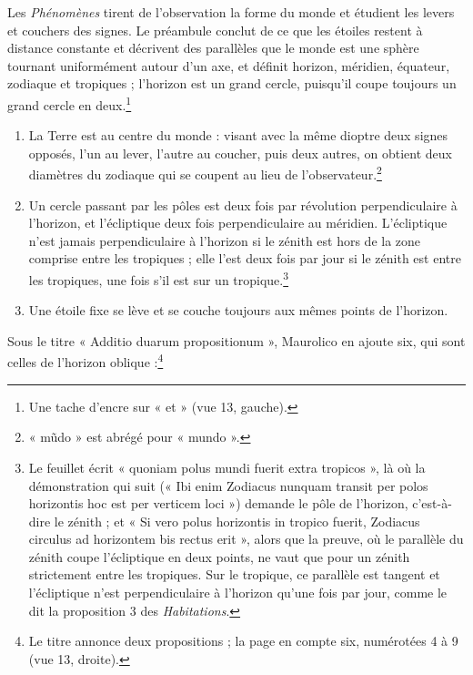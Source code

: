 \documentclass[11pt,a4paper]{article}
\begin{document}
Les \emph{Phénomènes} tirent de l'observation la forme du monde et étudient les
levers et couchers des signes. Le préambule conclut de ce que les étoiles restent
à distance constante et décrivent des parallèles que le monde est une sphère
tournant uniformément autour d'un axe, et définit horizon, méridien, équateur,
zodiaque et tropiques ; l'horizon est un grand cercle, puisqu'il coupe toujours
un grand cercle en deux.\footnote{Une tache d'encre sur « et » (vue 13, gauche).}

\begin{enumerate}
  \item[1.] La Terre est au centre du monde : visant avec la même dioptre deux
    signes opposés, l'un au lever, l'autre au coucher, puis deux autres, on
    obtient deux diamètres du zodiaque qui se coupent au lieu de
    l'observateur.\footnote{« mũdo » est abrégé pour « mundo ».}
  \item[2.] Un cercle passant par les pôles est deux fois par révolution
    perpendiculaire à l'horizon, et l'écliptique deux fois perpendiculaire au
    méridien. L'écliptique n'est jamais perpendiculaire à l'horizon si le zénith
    est hors de la zone comprise entre les tropiques ; elle l'est deux fois par
    jour si le zénith est entre les tropiques, une fois s'il est sur un
    tropique.\footnote{Le feuillet écrit « quoniam polus mundi fuerit extra
    tropicos », là où la démonstration qui suit (« Ibi enim Zodiacus nunquam
    transit per polos horizontis hoc est per verticem loci ») demande le pôle de
    l'horizon, c'est-à-dire le zénith ; et « Si vero polus horizontis in tropico
    fuerit, Zodiacus circulus ad horizontem bis rectus erit », alors que la
    preuve, où le parallèle du zénith coupe l'écliptique en deux points, ne vaut
    que pour un zénith strictement entre les tropiques. Sur le tropique, ce
    parallèle est tangent et l'écliptique n'est perpendiculaire à l'horizon
    qu'une fois par jour, comme le dit la proposition 3 des
    \emph{Habitations}.}
  \item[3.] Une étoile fixe se lève et se couche toujours aux mêmes points de
    l'horizon.
\end{enumerate}

Sous le titre « Additio duarum propositionum », Maurolico en ajoute six, qui
sont celles de l'horizon oblique :\footnote{Le titre annonce deux propositions ;
la page en compte six, numérotées 4 à 9 (vue 13, droite).}
\end{document}
